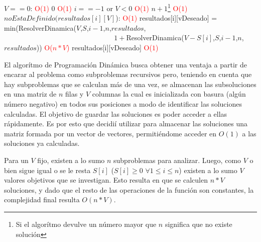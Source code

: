 \begin{codebox}
    \li \If $V == 0$: \textcolor{red}{O($1$)}
        \Then
         \li       \Return $0$ \textcolor{red}{O($1$)}
                \End
    \li \If $i == -1$ or $V<0$  \textcolor{red}{O($1$)}
        \Then
    \li                 \Return $n+1$\footnote{\label{bktrk}Si el algor\'itmo devulve un n\'umero mayor que $n$ significa que no existe soluci\'on} \textcolor{red}{O($1$)}
                \End
    \li \If $noEstaDefinido(resultados[i][V]$):  \textcolor{red}{O($1$)}
        \Then 
    \li          resultados[i][vDeseado] = min(ResolverDinamica($V$,$S$,$i-1$,$n$,$resultados$,
                            \\ $\qquad\qquad\qquad\qquad\qquad\qquad$$\qquad\quad\,\,$ $1+$ResolverDinamica($V-S[i]$,$S$,$i-1$,$n$,$resultados$)) \textcolor{red}{O($n*V$)}
                            \End
    \li \Return resultados[i][vDeseado]  \textcolor{red}{O($1$)}
    \end{codebox}
\par El algor\'itmo de Programaci\'on Din\'amica busca obtener una ventaja a partir de encarar al problema como
subproblemas recursivos pero, teniendo en cuenta que hay subproblemas que se calculan m\'as de una vez, se 
almacenan las subsoluciones  en una matriz de $n$ filas y $V$ columnas la cual es inicializada con basura (alg\'un n\'umero negativo)
en todos sus posiciones a modo de identificar las soluciones calculadas.
 El objetivo de guardar las soluciones es poder acceder a ellas
r\'apidamente. Es por esto que decidi\'i utilizar para almacenar las soluciones una matriz formada por un vector de 
vectores, permiti\'endome acceder en $O(1)$ a las soluciones ya calculadas.
\par Para un $V$ fijo, existen a lo sumo $n$ subproblemas para analizar. Luego, como $V$ o bien sigue igual o se le resta $S[i]$ ($S[i]\geq 0$ $\forall 1\leq i \leq n$)
existen a lo sumo $V$ valores objetivos que se investigan. Esto resulta en que se calculen $n*V$ soluciones, y dado que el resto de las operaciones de 
la funci\'on son constantes, la complejidad final resulta $O(n*V)$.
